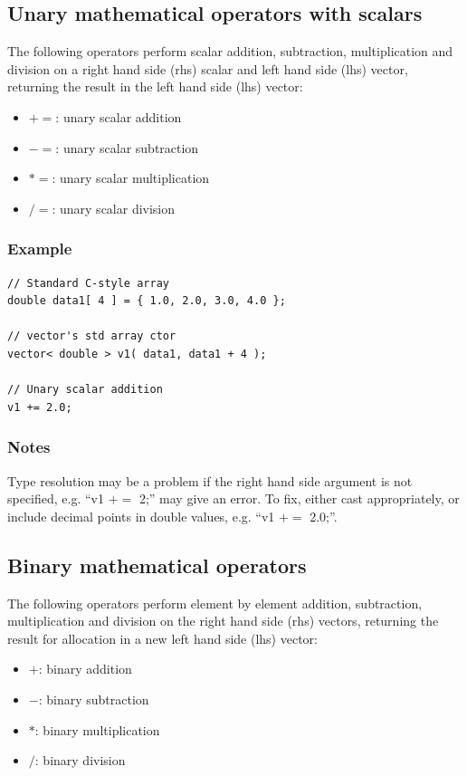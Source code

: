 \documentclass{report}
\begin{document}
\subsection{Unary mathematical operators with scalars}

The following operators perform scalar addition, subtraction,
multiplication and division on a right hand side (rhs) scalar and left
hand side (lhs) vector, returning the result in
 the left hand side
(lhs) vector:

\begin{itemize}
\item $+=$: unary scalar addition
\item $-=$: unary scalar subtraction
\item $*=$: unary scalar multiplication
\item $/=$: unary scalar division
\end{itemize}

\subsubsection{Example}

\begin{verbatim}
// Standard C-style array
double data1[ 4 ] = { 1.0, 2.0, 3.0, 4.0 };

// vector's std array ctor
vector< double > v1( data1, data1 + 4 );

// Unary scalar addition
v1 += 2.0;
\end{verbatim}

\subsubsection{Notes}
Type resolution may be a problem if the right hand side argument is
not specified, e.g. ``v1 $+=$ 2;'' may give an error.  To fix, either
cast appropriately, or include decimal points in double values,
e.g. ``v1 $+=$ 2.0;''.

\subsection{Binary mathematical operators}

The following operators perform element by element addition,
subtraction, multiplication and division on the right hand side (rhs)
vectors, returning the result for allocation in a new left hand side
(lhs) vector:

\begin{itemize}
\item $+$: binary addition
\item $-$: binary subtraction
\item $*$: binary multiplication
\item $/$: binary division
\end{itemize}
\end{document}
